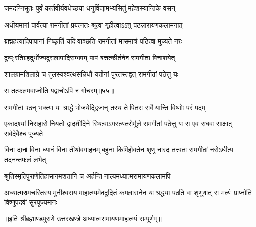 \twolineshloka
{जमदग्निसुतः पुर्वं कार्तवीर्यवधेच्छया}
{धनुर्विद्यामभ्यसितुं महेशस्यान्तिके वसन्} %

\twolineshloka
{अधीयमानां पार्वत्या रामगीतां प्रयत्नतः}
{श्रूत्वा गृहीत्वाऽऽशु पठन्नारायणकलामगात्} %

\twolineshloka
{ब्रह्महत्यादिपापानां निष्कृतिं यदि वाञ्छति}
{रामगीतां मासमात्रं पठित्वा मुच्यते नरः} %

\twolineshloka
{दुष्प्;रतिग्रहदुर्भोज्यदुरालापादिसम्भवम्}
{पापं यत्तत्कीर्तनेन रामगीता विनाशयेत्} %

\twolineshloka
{शालग्रामशिलाग्रे च तुलस्यश्वत्थसन्निधौ}
{यतीनां पुरतस्तद्वत् रामगीतां पठेत्तु यः} %

{स तत्फलमवाप्नोति यद्वाचोऽपि न गोचरम्॥५५॥} %


\twolineshloka
{रामगीतां पठन् भक्त्या यः श्राद्धे भोजयेद्द्विजान्}
{तस्य ते पितरः सर्वे यान्ति विष्णोः परं पदम्} %

\threelineshloka
{एकादश्यां निराहारो नियतो द्वादशीदिने}
{स्थित्वाऽगस्त्यतरोर्मूले रामगीतां पठेत्तु यः}
{स एव राघवः साक्षात् सर्वदेवैश्च पूज्यते} %

\threelineshloka
{विना दानां विना ध्यानं विना तीर्थावगाहनम्}
{बहुना किमिहोक्तेन शृणु नारद तत्त्वतः}
{रामगीतां नरोऽधीत्य तदनन्तफलं लभेत्} %

\twolineshloka
{श्रुतिस्मृतिपुराणेतिहासागमशतानि च}
{अर्हन्ति नाल्पमध्यात्मरामायणकलामपि} %

\fourlineindentedshloka
{अध्यात्मरामचरितस्य मुनीश्वराय}
{माहात्म्यमेतदुदितं कमलासनेन}
{यः श्रद्धया पठति वा शृणुयात् स मर्त्यः}
{प्राप्नोति विष्णुपदवीं सुरपूज्यमानः} %

{॥इति श्रीब्रह्माण्डपुराणे उत्तरखण्डे अध्यात्मरामायणमाहात्म्यं सम्पूर्णम्॥
}

